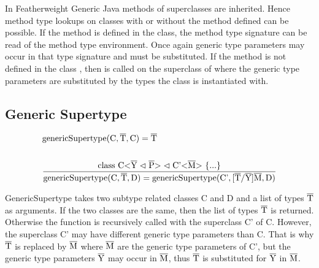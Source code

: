 In Featherweight Generic Java methods of superclasses are inherited. Hence method type lookups on classes with or without the method defined can be possible. If the method is defined in the class, the method type signature can be read of the method type environment. Once again generic type parameters may occur in that type signature and must be substituted.
If the method is not defined in the class , then  is called on the superclass of  where the generic type parameters are substituted by the types the class  is instantiated with.

\subsection{Generic Supertype}

\begin{align*}
    &\text{genericSupertype} (\text{C}, \overline{\text{T}}, \text{C} ) = \overline{\text{T}}\\
    \\
    &\frac{ \text{class} \ \text{C} \text{<} \overline{\text{Y}} \vartriangleleft \overline{\text{P}} \text{>} \vartriangleleft \text{C'<}\overline{\text{M}}\text{>} \ \{ ... \} }{ \text{genericSupertype} ( \text{C}, \overline{\text{T}}, \text{D} ) = \text{genericSupertype} ( \text{C'}, \text{[}\overline{\text{T}}/\overline{\text{Y}}\text{]}\overline{\text{M}}, \text{D} ) }\\
\end{align*}

GenericSupertype takes two subtype related classes C and D and a list of types $\overline{\text{T}}$ as arguments. If the two classes are the same, then the list of types $\overline{\text{T}}$ is returned. Otherwise the function is recursively called with the superclass C' of C.
However, the superclass C' may have different generic type parameters than C. That is why $\overline{\text{T}}$ is replaced by $\overline{\text{M}}$ where $\overline{\text{M}}$ are the generic type parameters of C', but the generic type parameters $\overline{\text{Y}}$ may occur in $\overline{\text{M}}$, thus $\overline{\text{T}}$ is substituted for $\overline{\text{Y}}$ in $\overline{\text{M}}$.
